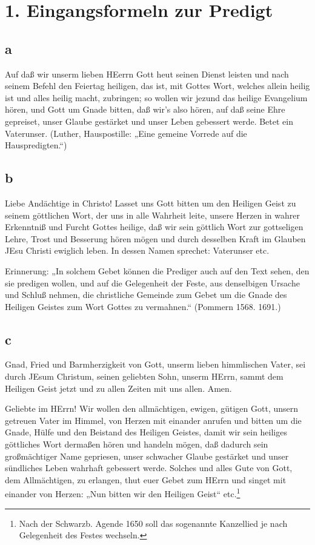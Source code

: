 \section{1. Eingangsformeln zur Predigt}

\subsection{a}

Auf daß wir unserm lieben HEerrn Gott heut seinen Dienst leisten und nach seinem Befehl den Feiertag heiligen, das ist, mit Gottes Wort, welches allein heilig ist und alles heilig macht, zubringen; so wollen wir jezund das heilige Evangelium hören, und Gott um Gnade bitten, daß wir’s also hören, auf daß seine Ehre gepreiset, unser Glaube gestärket und unser Leben gebessert werde. Betet ein Vaterunser. (Luther, Hauspostille: „Eine gemeine Vorrede auf die Hauspredigten.“)

\subsection{b}

Liebe Andächtige in Christo! Lasset uns Gott bitten um den Heiligen Geist zu seinem göttlichen Wort, der uns in alle Wahrheit leite, unsere Herzen in wahrer Erkenntniß und Furcht Gottes heilige, daß wir sein göttlich Wort zur gottseligen Lehre, Trost und Besserung hören mögen und durch desselben Kraft im Glauben JEsu Christi ewiglich leben. In dessen Namen sprechet: Vaterunser etc.

Erinnerung: „In solchem Gebet können die Prediger auch auf den Text sehen, den sie predigen wollen, und auf die Gelegenheit der Feste, aus denselbigen Ursache und Schluß nehmen, die christliche Gemeinde zum Gebet um die Gnade des Heiligen Geistes zum Wort Gottes zu vermahnen.“ (Pommern 1568. 1691.)

\subsection{c}

Gnad, Fried und Barmherzigkeit von Gott, unserm lieben himmlischen Vater, sei durch JEsum Christum, seinen geliebten Sohn, unserm HErrn, sammt dem Heiligen Geist jetzt und zu allen Zeiten mit uns allen. Amen.

Geliebte im HErrn! Wir wollen den allmächtigen, ewigen, gütigen Gott, unsern getreuen Vater im Himmel, von Herzen mit einander anrufen und bitten um die Gnade, Hülfe und den Beistand des Heiligen Geistes, damit wir sein heiliges göttliches Wort dermaßen hören und handeln mögen, daß dadurch sein großmächtiger Name gepriesen, unser schwacher Glaube gestärket und unser sündliches Leben wahrhaft gebessert werde. Solches und alles Gute von Gott, dem Allmächtigen, zu erlangen, thut euer Gebet zum HErrn und singet mit einander von Herzen: „Nun bitten wir den Heiligen Geist“ etc.\footnote{Nach der Schwarzb. Agende 1650 soll das sogenannte Kanzellied je nach Gelegenheit des Festes wechseln.}

